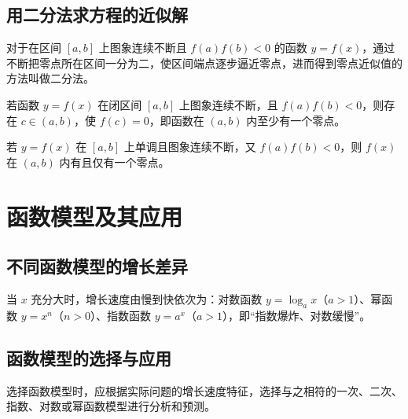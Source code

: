 \subsection{用二分法求方程的近似解}
\begin{definition}[二分法]
对于在区间 $[a,b]$ 上图象连续不断且 $f(a)f(b)<0$ 的函数 $y=f(x)$，通过不断把零点所在区间一分为二，使区间端点逐步逼近零点，进而得到零点近似值的方法叫做二分法。
\end{definition}
\begin{theorem}[函数零点存在定理]
若函数 $y=f(x)$ 在闭区间 $[a,b]$ 上图象连续不断，且 $f(a)f(b)<0$，则存在 $c \in (a,b)$，使 $f(c)=0$，即函数在 $(a,b)$ 内至少有一个零点。
\end{theorem}
\begin{corollary}[零点个数与单调性]
若 $y=f(x)$ 在 $[a,b]$ 上单调且图象连续不断，又 $f(a)f(b)<0$，则 $f(x)$ 在 $(a,b)$ 内有且仅有一个零点。
\end{corollary}

\section{函数模型及其应用}
\subsection{不同函数模型的增长差异}
\begin{definition}[不同函数模型的增长差异]
当 $x$ 充分大时，增长速度由慢到快依次为：对数函数 $y=\log_a x$（$a>1$）、幂函数 $y=x^n$（$n>0$）、指数函数 $y=a^x$（$a>1$），即“指数爆炸、对数缓慢”。
\end{definition}
\subsection{函数模型的选择与应用}
\begin{definition}[函数模型的选择]
选择函数模型时，应根据实际问题的增长速度特征，选择与之相符的一次、二次、指数、对数或幂函数模型进行分析和预测。
\end{definition}
